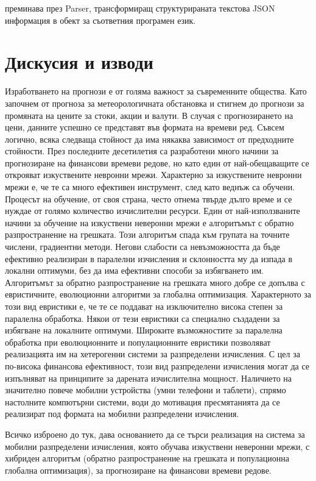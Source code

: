 преминава през Parser, трансформиращ структурираната текстова JSON информация в обект за съответния програмен език. 

\section{Дискусия и изводи}

Изработването на прогнози е от голяма важност за съвременните общества. Като започнем от прогноза за метеорологичната обстановка и стигнем до прогнози за промяната на цените за стоки, акции и валути. В случая с прогнозирането на цени, данните успешно се представят във формата на времеви ред. Съвсем логично, всяка следваща стойност да има някаква зависимост от предходните стойности. През последните десетилетия са разработени много начини за прогнозиране на финансови времеви редове, но като един от най-обещаващите се открояват изкуствените невронни мрежи. Характерно за изкуствените невронни мрежи е, че те са много ефективен инструмент, след като веднъж са обучени. Процесът на обучение, от своя страна, често отнема твърде дълго време и се нуждае от голямо количество изчислителни ресурси. Един от най-използваните начини за обучение на изкуствени неверонни мрежи е алгоритъмът с обратно разпространение на грешката. Този алгоритъм спада към групата на точните числени, градиентни методи. Негови слабости са невъзможността да бъде ефективно реализиран в паралелни изчисления и склонността му да изпада в локални оптимуми, без да има ефективни способи за избягването им. Алгоритъмът за обратно разпространение на грешката много добре се допълва с евристичните, еволюционни алгоритми за глобална оптимизация. Характерното за този вид евристики е, че те се поддават на изключително висока степен за паралелна обработка. Някои от тези евристики са специално създадени за избягване на локалните оптимуми. Широките възможностите за паралелна обработка при еволюционните и популационните евристики позволяват реализацията им на хетерогенни системи за разпределени изчисления. С цел за по-висока финансова ефективност, този вид разпределени изчисления могат да се изпълняват на принципите за дарената изчислителна мощност. Наличието на значително повече мобилни устройства (умни телефони и таблети), спрямо настолните компютърни системи, води до мотивация пресмятанията да се реализират под формата на мобилни разпределени изчисления.

Всичко изброено до тук, дава основанието да се търси реализация на система за мобилни разпределени изчисления, която обучава изкуствени неверонни мрежи, с хибриден алгоритъм (обратно разпространение на грешката и популационна глобална оптимизация), за прогнозиране на финансови времеви редове. 

